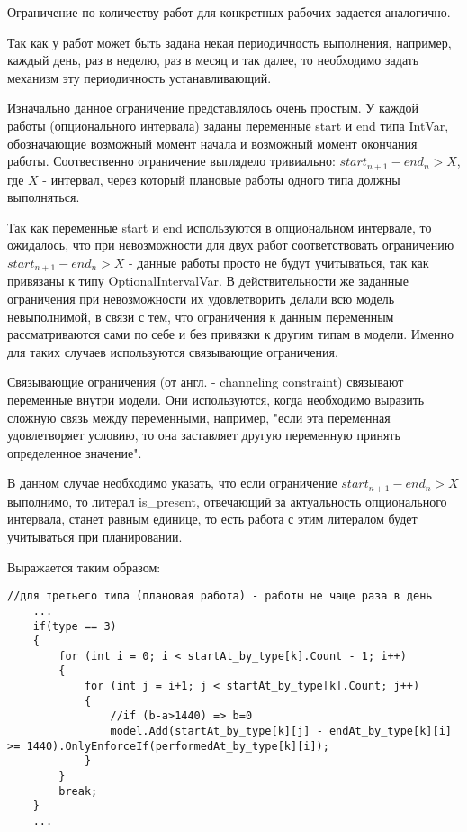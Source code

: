 Ограничение по количеству работ для конкретных рабочих задается аналогично.

Так как у работ может быть задана некая периодичность выполнения, например, каждый день, раз в неделю, раз в месяц и так далее, то необходимо задать механизм эту периодичность устанавливающий.

Изначально данное ограничение представлялось очень простым. У каждой работы (опционального интервала) заданы переменные start и end типа IntVar, обозначающие возможный момент начала и возможный момент окончания работы. Соотвественно ограничение выглядело тривиально: $start_{n+1} - end_n > X$, где $X$ - интервал, через который плановые работы одного типа должны выполняться.

Так как переменные start и end используются в опциональном интервале, то ожидалось, что при невозможности для двух работ соответствовать ограничению $start_{n+1} - end_n > X$ - данные работы просто не будут учитываться, так как привязаны к типу OptionalIntervalVar. В действительности же заданные ограничения при невозможности их удовлетворить делали всю модель невыполнимой, в связи с тем, что ограничения к данным переменным рассматриваются сами по себе и без привязки к другим типам в модели. Именно для таких случаев используются связывающие ограничения.

Связывающие ограничения (от англ. - channeling constraint) связывают переменные внутри модели. Они используются, когда необходимо выразить сложную связь между переменными, например, "если эта переменная удовлетворяет условию, то она заставляет другую переменную принять определенное значение".

В данном случае необходимо указать, что если ограничение $start_{n+1} - end_n > X$ выполнимо, то литерал is\_present, отвечающий за актуальность опционального интервала, станет равным единице, то есть работа с этим литералом будет учитываться при планировании.

Выражается таким образом:

\begin{verbatim}
//для третьего типа (плановая работа) - работы не чаще раза в день
    ...
    if(type == 3)
    {
        for (int i = 0; i < startAt_by_type[k].Count - 1; i++)
        {
            for (int j = i+1; j < startAt_by_type[k].Count; j++)
            {
                //if (b-a>1440) => b=0
                model.Add(startAt_by_type[k][j] - endAt_by_type[k][i] >= 1440).OnlyEnforceIf(performedAt_by_type[k][i]);
            }
        }
        break;
    }
    ...    
\end{verbatim}

